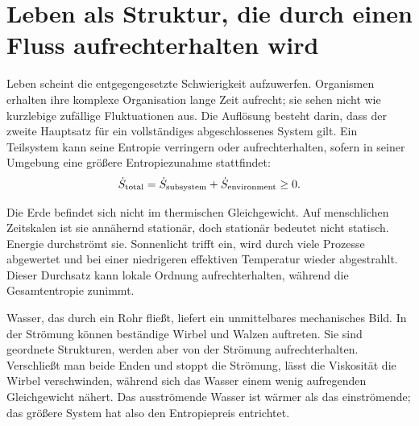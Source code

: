 \section{Leben als Struktur, die durch einen Fluss aufrechterhalten wird}

Leben scheint die entgegengesetzte Schwierigkeit aufzuwerfen. Organismen erhalten ihre komplexe Organisation lange Zeit aufrecht; sie sehen nicht wie kurzlebige zufällige Fluktuationen aus. Die Auflösung besteht darin, dass der zweite Hauptsatz für ein vollständiges abgeschlossenes System gilt. Ein Teilsystem kann seine Entropie verringern oder aufrechterhalten, sofern in seiner Umgebung eine größere Entropiezunahme stattfindet:
\begin{equation}
 \dot S_{\rm total}
 =\dot S_{\rm subsystem}+\dot S_{\rm environment}\geq 0.
 \label{eq:sm8-open-system-second-law}
\end{equation}

Die Erde befindet sich nicht im thermischen Gleichgewicht. Auf menschlichen Zeitskalen ist sie annähernd stationär, doch stationär bedeutet nicht statisch. Energie durchströmt sie. Sonnenlicht trifft ein, wird durch viele Prozesse abgewertet und bei einer niedrigeren effektiven Temperatur wieder abgestrahlt. Dieser Durchsatz kann lokale Ordnung aufrechterhalten, während die Gesamtentropie zunimmt.

Wasser, das durch ein Rohr fließt, liefert ein unmittelbares mechanisches Bild. In der Strömung können beständige Wirbel und Walzen auftreten. Sie sind geordnete Strukturen, werden aber von der Strömung aufrechterhalten. Verschließt man beide Enden und stoppt die Strömung, lässt die Viskosität die Wirbel verschwinden, während sich das Wasser einem wenig aufregenden Gleichgewicht nähert. Das ausströmende Wasser ist wärmer als das einströmende; das größere System hat also den Entropiepreis entrichtet.

\begin{classroomqa}
\end{classroomqa}

